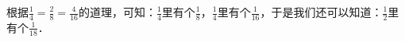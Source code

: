 
根据$\frac{1}{4}=\frac{2}{8}=\frac{4}{16}$的道理，可知：$\frac{1}{4}$里有\key{\hspace{4em}}个$\frac{1}{8}$，$\frac{1}{4}$里有\key{\hspace{4em}}个$\frac{1}{16}$，于是我们还可以知道：$\frac{1}{2}$里有\key{\hspace{4em}}个$\frac{1}{18}$．

